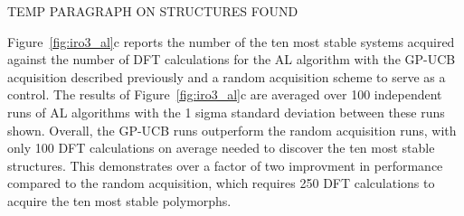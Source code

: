 %
TEMP PARAGRAPH ON STRUCTURES FOUND


%
Figure~\ref{fig:iro3_al}c reports the number of the ten most stable systems acquired against the number of DFT calculations for the AL algorithm with the GP-UCB acquisition described previously and a random acquisition scheme to serve as a control.
%
The results of Figure~\ref{fig:iro3_al}c are averaged over 100 independent runs of AL algorithms with the 1 sigma standard deviation between these runs shown.
%
Overall, the GP-UCB runs outperform the random acquisition runs, with only \num{100} DFT calculations on average needed to discover the ten most stable structures.
%
This demonstrates over a factor of two improvment in performance compared to the random acquisition, which requires \mytilde\num{250} DFT calculations to acquire the ten most stable polymorphs.


